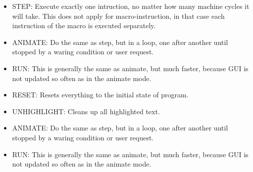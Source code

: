     \begin{itemize}
        \item STEP: Execute exactly one intruction, no matter how many machine cycles it will take. This does not apply for macro-instruction, in that case each instruction of the macro is executed separately.
        \item ANIMATE: Do the same as step, but in a loop, one after another until stopped by a waring condition or user request.
        \item RUN: This is generally the same as animate, but much faster, because GUI is not updated so often as in the animate mode.
        \item RESET: Resets everything to the initial state of program.
        \item UNHIGHLIGHT: Cleans up all highlighted text.

        \item ANIMATE: Do the same as step, but in a loop, one after another until stopped by a waring condition or user request.
        \item RUN: This is generally the same as animate, but much faster, because GUI is not updated so often as in the animate mode.

    \end{itemize}
